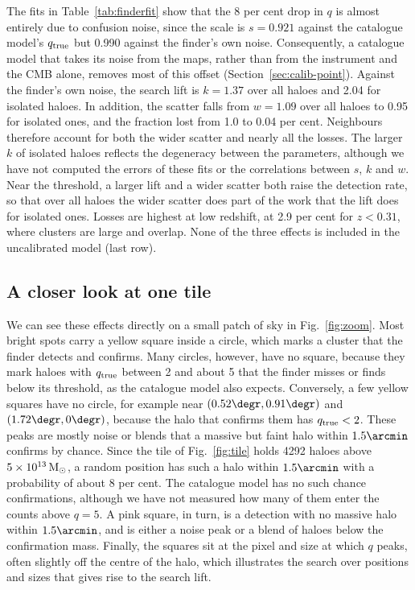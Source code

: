 The fits in Table~\ref{tab:finderfit} show that the 8 per cent drop in $q$ is almost entirely due to
confusion noise, since the scale is $s = 0.921$ against the catalogue model's $q_\mathrm{true}$ but 0.990 against the
finder's own noise. Consequently, a catalogue model that takes its noise from the maps, rather than from the
instrument and the CMB alone, removes most of this offset (Section~\ref{sec:calib-point}). Against the finder's own
noise, the search lift is $k = 1.37$ over all haloes and 2.04 for isolated haloes. In addition, the scatter
falls from $w = 1.09$ over all haloes to 0.95 for isolated ones, and the fraction lost from 1.0 to 0.04 per cent. Neighbours therefore account for both the wider scatter and nearly all the losses. The larger $k$ of
isolated haloes reflects the degeneracy between the parameters, although we have not computed the errors of
these fits or the correlations between $s$, $k$ and $w$. Near the threshold, a larger lift and a wider
scatter both raise the detection rate, so that over all haloes the wider scatter does part of the work that
the lift does for isolated ones. Losses are highest at low redshift, at 2.9 per cent for $z < 0.31$, where clusters
are large and overlap. None of the three effects is included in the uncalibrated model (last row).

\subsection{A closer look at one tile}\label{sec:finder_zoom}

We can see these effects directly on a small patch of sky in Fig.~\ref{fig:zoom}. Most bright spots carry a
yellow square inside a circle, which marks a cluster that the finder detects and confirms. Many circles,
however, have no square, because they mark haloes with $q_\mathrm{true}$ between 2 and about 5 that the finder misses
or finds below its threshold, as the catalogue model also expects. Conversely, a few yellow squares have no
circle, for example near $(0.52\degr, 0.91\degr)$ and $(1.72\degr, 0\degr)$, because the halo that confirms
them has $q_\mathrm{true} < 2$. These peaks are mostly noise or blends that a massive but faint halo within
$1.5\arcmin$ confirms by chance. Since the tile of Fig.~\ref{fig:tile} holds 4292 haloes above
$5\times10^{13}\,\mathrm{M}_\odot$, a random position has such a halo within $1.5\arcmin$ with a probability of about 8
per cent. The catalogue model has no such chance confirmations, although we have not measured how many of them
enter the counts above $q = 5$. A pink square, in turn, is a detection with no massive halo within
$1.5\arcmin$, and is either a noise peak or a blend of haloes below the confirmation mass. Finally, the squares
sit at the pixel and size at which $q$ peaks, often slightly off the centre of the halo, which illustrates the
search over positions and sizes that gives rise to the search lift.

